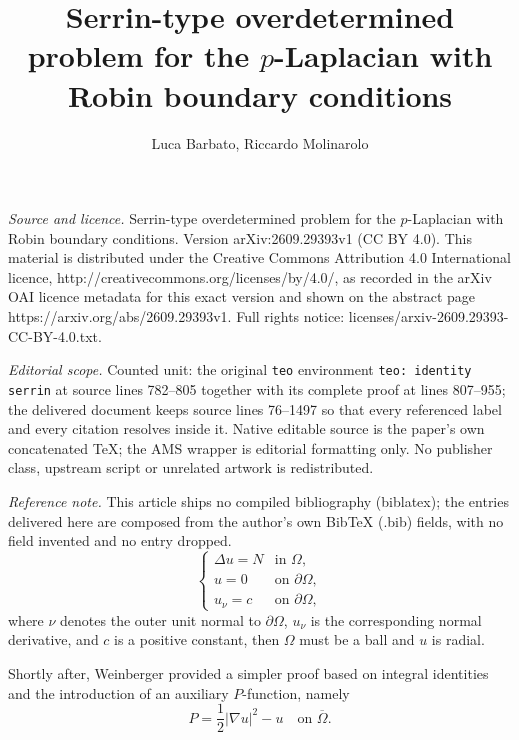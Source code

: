 \documentclass[10pt,a4paper]{amsart}
\numberwithin{equation}{section}
\begin{document}
\title[Serrin-type overdetermined problem for the p-Laplacian with ]{Serrin-type overdetermined problem for the $p$-Laplacian with Robin boundary conditions}
\author{Luca Barbato, Riccardo Molinarolo}
\date{}
\maketitle
\noindent\emph{Source and licence.} Serrin-type overdetermined problem for the $p$-Laplacian with Robin boundary conditions. Version arXiv:2609.29393v1 (CC BY 4.0). This material is distributed under the Creative Commons Attribution 4.0 International licence, http://creativecommons.org/licenses/by/4.0/, as recorded in the arXiv OAI licence metadata for this exact version and shown on the abstract page https://arxiv.org/abs/2609.29393v1. Full rights notice: licenses/arxiv-2609.29393-CC-BY-4.0.txt.\par\smallskip
\noindent\textit{Editorial scope.} Counted unit: the original \texttt{teo} environment \texttt{teo: identity serrin} at source lines 782--805 together with its complete proof at lines 807--955; the delivered document keeps source lines 76--1497 so that every referenced label and every citation resolves inside it. Native editable source is the paper's own concatenated TeX; the AMS wrapper is editorial formatting only. No publisher class, upstream script or unrelated artwork is redistributed.
\par\smallskip\noindent\textit{Reference note.} This article ships no compiled bibliography (biblatex); the entries delivered here are composed from the author's own BibTeX (.bib) fields, with no field invented and no entry dropped.
\begin{equation}\label{intro PbD}
\begin{cases}
\Delta u = N &\text{in } \Omega,
\\
u = 0 &\text{on } \partial\Omega,
\\
u_\nu = c &\text{on } \partial\Omega,
\end{cases}
\end{equation}
where $\nu$ denotes the outer unit normal to $\partial\Omega$, $u_\nu$ is the corresponding normal derivative, and $c$ is a positive constant, then $\Omega$ must be a ball and $u$ is radial. 

Shortly after, Weinberger \cite{w} provided a simpler proof based on integral identities and the introduction of an auxiliary $P$-function, namely
\begin{equation}\label{intro eq P}
        P = \frac{1}{2} |\nabla u|^2 - u \quad\text{on }\overline{\Omega}.
\end{equation}
\end{document}
